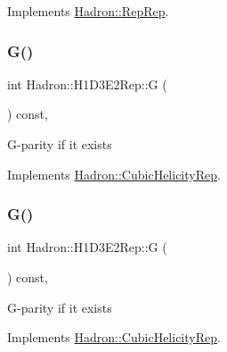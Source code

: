 Implements \mbox{\hyperlink{structHadron_1_1RepRep_a92c8802e5ed7afd7da43ccfd5b7cd92b}{Hadron\+::\+Rep\+Rep}}.

\mbox{\label{structHadron_1_1H1D3E2Rep_a88ee6e489859f4eada7e37ac4333c6fd}} 
\subsubsection{\texorpdfstring{G()}{G()}\hspace{0.1cm}{\footnotesize\ttfamily [1/3]}}
{\footnotesize\ttfamily int Hadron\+::\+H1\+D3\+E2\+Rep\+::G (\begin{DoxyParamCaption}{ }\end{DoxyParamCaption}) const\hspace{0.3cm}{\ttfamily [inline]}, {\ttfamily [virtual]}}

G-\/parity if it exists 

Implements \mbox{\hyperlink{structHadron_1_1CubicHelicityRep_a50689f42be1e6170aa8cf6ad0597018b}{Hadron\+::\+Cubic\+Helicity\+Rep}}.

\mbox{\label{structHadron_1_1H1D3E2Rep_a88ee6e489859f4eada7e37ac4333c6fd}} 
\subsubsection{\texorpdfstring{G()}{G()}\hspace{0.1cm}{\footnotesize\ttfamily [2/3]}}
{\footnotesize\ttfamily int Hadron\+::\+H1\+D3\+E2\+Rep\+::G (\begin{DoxyParamCaption}{ }\end{DoxyParamCaption}) const\hspace{0.3cm}{\ttfamily [inline]}, {\ttfamily [virtual]}}

G-\/parity if it exists 

Implements \mbox{\hyperlink{structHadron_1_1CubicHelicityRep_a50689f42be1e6170aa8cf6ad0597018b}{Hadron\+::\+Cubic\+Helicity\+Rep}}.

\mbox{\label{structHadron_1_1H1D3E2Rep_a88ee6e489859f4eada7e37ac4333c6fd}} 
